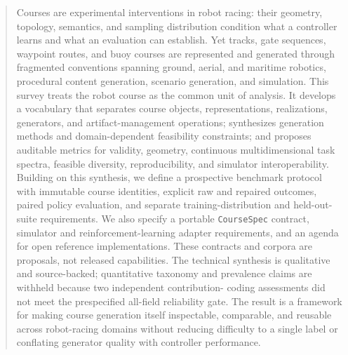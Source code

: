 \begin{abstract}
Courses are experimental interventions in robot racing: their geometry, topology,
semantics, and sampling distribution condition what a controller learns and what an
evaluation can establish. Yet tracks, gate sequences, waypoint routes, and buoy
courses are represented and generated through fragmented conventions spanning ground,
aerial, and maritime robotics, procedural content generation, scenario generation,
and simulation. This survey treats the robot course as the common unit of analysis.
It develops a vocabulary that separates course objects, representations,
realizations, generators, and artifact-management operations; synthesizes generation
methods and domain-dependent feasibility constraints; and proposes auditable metrics
for validity, geometry, continuous multidimensional task spectra, feasible diversity,
reproducibility, and simulator interoperability. Building on this synthesis, we define
a prospective benchmark protocol with immutable course identities, explicit raw and
repaired outcomes, paired policy evaluation, and separate training-distribution and
held-out-suite requirements. We also specify a portable \texttt{CourseSpec} contract,
simulator and reinforcement-learning adapter requirements, and an agenda for open
reference implementations. These contracts and corpora are proposals, not released
capabilities. The technical synthesis is qualitative and source-backed; quantitative
taxonomy and prevalence claims are withheld because two independent contribution-
coding assessments did not meet the prespecified all-field reliability gate. The
result is a framework for making course generation itself inspectable, comparable,
and reusable across robot-racing domains without reducing difficulty to a single
label or conflating generator quality with controller performance.
\end{abstract}
